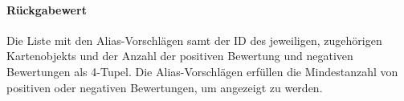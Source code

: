 \paragraph*{Rückgabewert}
Die Liste mit den Alias-Vorschlägen samt der ID des jeweiligen, zugehörigen Kartenobjekts und der Anzahl der positiven Bewertung und negativen Bewertungen als 4-Tupel. 
Die Alias-Vorschlägen erfüllen die Mindestanzahl von positiven oder negativen Bewertungen, um angezeigt zu werden.
